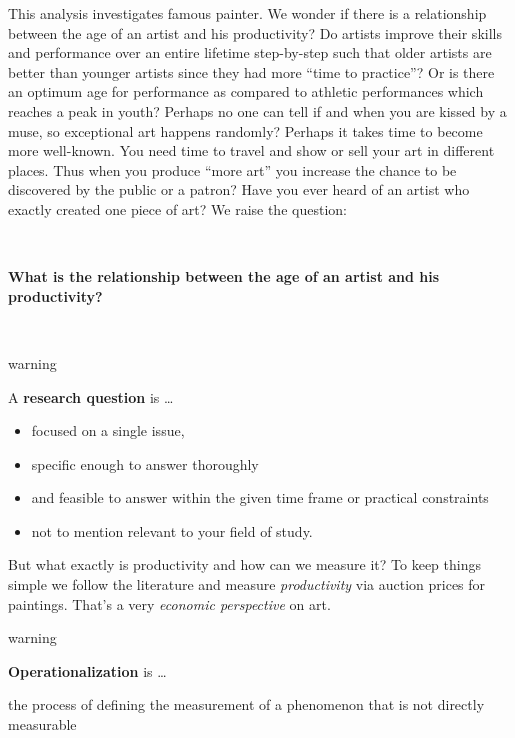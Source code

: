 \documentclass[
]{book}
\providecommand{\tightlist}{%
  \setlength{\itemsep}{0pt}\setlength{\parskip}{0pt}}
\begin{document}
This analysis investigates famous painter. We wonder if there is a relationship between the age of an artist and his productivity? Do artists improve their skills and performance over an entire lifetime step-by-step such that older artists are better than younger artists since they had more ``time to practice''? Or is there an optimum age for performance as compared to athletic performances which reaches a peak in youth? Perhaps no one can tell if and when you are kissed by a muse, so exceptional art happens randomly? Perhaps it takes time to become more well-known. You need time to travel and show or sell your art in different places. Thus when you produce ``more art'' you increase the chance to be discovered by the public or a patron? Have you ever heard of an artist who exactly created one piece of art? We raise the question:

~

\textbf{What is the relationship between the age of an artist and his productivity?}

~

\begin{infobox}warning

A \textbf{research question} is \ldots{}

\begin{itemize}
\tightlist
\item
  focused on a single issue,
\item
  specific enough to answer thoroughly
\item
  and feasible to answer within the given time frame or practical constraints
\item
  not to mention relevant to your field of study.\\
\end{itemize}

\end{infobox}

But what exactly is productivity and how can we measure it? To keep things simple we follow the literature and measure \emph{productivity} via auction prices for paintings. That's a very \emph{economic perspective} on art.

\begin{infobox}warning

\textbf{Operationalization} is \ldots{}

the process of defining the measurement of a phenomenon that is not directly measurable

\end{infobox}
\end{document}
